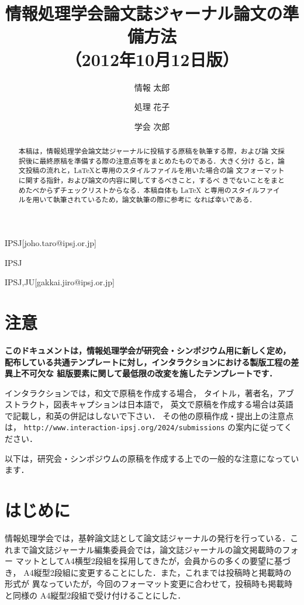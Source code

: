 \documentclass[submit,techrep]{ipsj}
\begin{document}
\title{情報処理学会論文誌ジャーナル論文の準備方法\\
（2012年10月12日版）}



\author{情報 太郎}{}{IPSJ}[joho.taro@ipsj.or.jp]
\author{処理 花子}{}{IPSJ}
\author{学会 次郎}{}{IPSJ,JU}[gakkai.jiro@ipsj.or.jp]

\begin{abstract}
本稿は，情報処理学会論文誌ジャーナルに投稿する原稿を執筆する際，および論
文採択後に最終原稿を準備する際の注意点等をまとめたものである．大きく分け
ると，論文投稿の流れと，\LaTeX と専用のスタイルファイルを用いた場合の論
文フォーマットに関する指針，および論文の内容に関してするべきこと，するべ
きでないことをまとめたべからずチェックリストからなる．本稿自体も \LaTeX 
と専用のスタイルファイルを用いて執筆されているため，論文執筆の際に参考に
なれば幸いである．
\end{abstract}

\maketitle

\section{注意}

{\bf
このドキュメントは，情報処理学会が研究会・シンポジウム用に新しく定め，
配布している共通テンプレートに対し，インタラクションにおける製版工程の差異上不可欠な
組版要素に関して最低限の改変を施したテンプレートです．

インタラクションでは，和文で原稿を作成する場合，
タイトル，著者名，アブストラクト，図表キャプションは日本語で，
英文で原稿を作成する場合は英語で記載し，和英の併記はしないで下さい．
その他の原稿作成・提出上の注意点は，
\texttt{http://www.interaction-ipsj.org/2024/submissions} の案内に従ってください．

以下は，研究会・シンポジウムの原稿を作成する上での一般的な注意になっています．
}

\section{はじめに}

情報処理学会では，基幹論文誌として論文誌ジャーナルの発行を行っている．こ
れまで論文誌ジャーナル編集委員会では，論文誌ジャーナルの論文掲載時のフォー
マットとしてA4横型2段組を採用してきたが，会員からの多くの要望に基づき，
A4縦型2段組に変更することにした．また，これまでは投稿時と掲載時の形式が
異なっていたが，今回のフォーマット変更に合わせて，投稿時も掲載時と同様の
A4縦型2段組で受け付けることにした．
\end{document}
